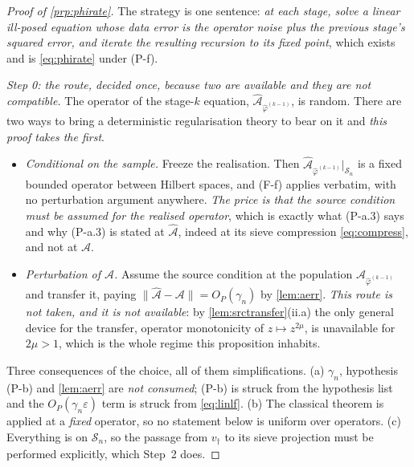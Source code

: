 \begin{proof}[Proof of \cref{prp:phirate}]
The strategy is one sentence: \emph{at each stage, solve a linear ill-posed equation whose data error
is the operator noise plus the previous stage's squared error, and iterate the resulting recursion to
its fixed point}, which exists and is \eqref{eq:phirate} under (P-f).

\emph{Step 0: the route, decided once, because two are available and they are not compatible.} The
operator of the stage-$k$ equation, $\hat{\mathcal A}_{\hat\varphi^{(k-1)}}$, is random. There are two
ways to bring a deterministic regularisation theory to bear on it and \emph{this proof takes the
first}.
\begin{itemize}
\item[--] \emph{Conditional on the sample.} Freeze the realisation. Then
$\hat{\mathcal A}_{\hat\varphi^{(k-1)}}\vert_{\mathcal S_n}$ is a fixed bounded operator between
Hilbert spaces, and (F-f) applies verbatim, with no perturbation argument anywhere. \emph{The price is
that the source condition must be assumed for the realised operator}, which is exactly what
(P-a.3) says and why (P-a.3) is stated at $\hat{\mathcal A}$, indeed at its sieve compression
\eqref{eq:compress}, and not at $\mathcal A$.
\item[--] \emph{Perturbation of $\mathcal A$.} Assume the source condition at the population
$\mathcal A_{\hat\varphi^{(k-1)}}$ and transfer it, paying $\|\hat{\mathcal A}-\mathcal A\|=O_P(\gamma_n)$
by \cref{lem:aerr}. \emph{This route is not taken, and it is not available}: by
\cref{lem:srctransfer}(ii.a) the only general device for the transfer, operator monotonicity of
$z\mapsto z^{2\mu}$, is unavailable for $2\mu>1$, which is the whole regime this proposition inhabits.
\end{itemize}
Three consequences of the choice, all of them simplifications. (a) $\gamma_n$, hypothesis (P-b) and \cref{lem:aerr} are
\emph{not consumed}; (P-b) is struck from the hypothesis list and the $O_P(\gamma_n\varepsilon)$ term is
struck from \eqref{eq:linlf}. (b) The classical theorem is applied at a \emph{fixed} operator, so no
statement below is uniform over operators. (c) Everything is on $\mathcal S_n$, so the passage from
$v_\dagger$ to its sieve projection must be performed explicitly, which Step~2 does.


\end{proof}
